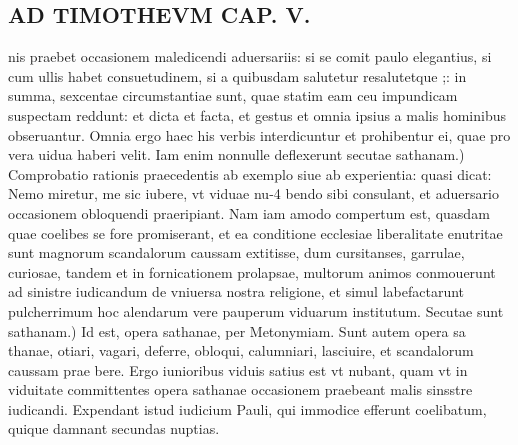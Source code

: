 \documentclass{article}
\begin{document}
\begin{pages}
\section*{AD TIMOTHEVM CAP. V. }
\marginpar{[ p.111 ]}\pstart nis praebet occasionem maledicendi aduersariis: si se comit paulo elegantius, si cum ullis habet consuetudinem, si a quibusdam salutetur resalutetque ;: in summa, sexcentae circumstantiae sunt, quae statim eam ceu impundicam suspectam reddunt: et dicta et facta, et gestus et omnia ipsius a malis hominibus obseruantur. Omnia ergo haec his verbis interdicuntur et prohibentur ei, quae pro vera uidua haberi velit.  \pend\pstart Iam enim nonnulle deflexerunt secutae sathanam.) Comprobatio rationis praecedentis ab exemplo siue ab experientia: quasi dicat: Nemo miretur, me sic iubere, vt viduae nu-4 bendo sibi consulant, et aduersario occasionem obloquendi praeripiant. Nam iam amodo compertum est, quasdam quae coelibes se fore promiserant, et ea conditione ecclesiae liberalitate enutritae sunt magnorum scandalorum caussam extitisse, dum cursitanses, garrulae, curiosae, tandem et in fornicationem prolapsae, multorum animos conmouerunt ad sinistre iudicandum de vniuersa nostra religione, et simul labefactarunt pulcherrimum hoc alendarum vere pauperum viduarum institutum.  \pend\pstart Secutae sunt sathanam.) Id est, opera sathanae, per Metonymiam. Sunt autem opera sa thanae, otiari, vagari, deferre, obloqui, calumniari, lasciuire, et scandalorum caussam prae bere. Ergo iunioribus viduis satius est vt nubant, quam vt in viduitate committentes opera sathanae occasionem praebeant malis sinsstre iudicandi. Expendant istud iudicium Pauli, qui immodice efferunt coelibatum, quique damnant secundas nuptias.  \pend
{}
{}

\end{pages}
\end{document}
